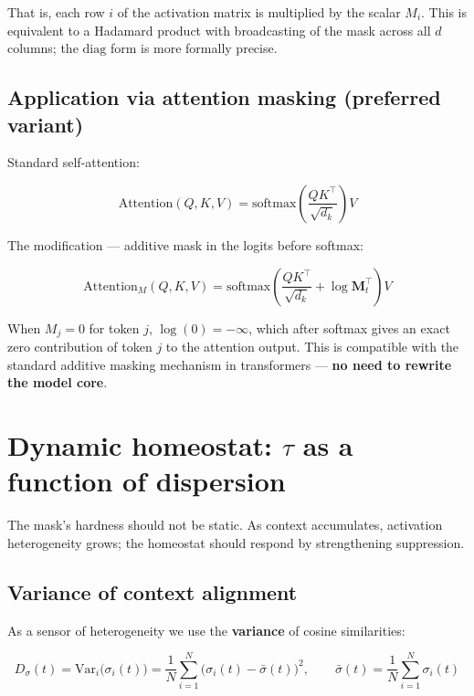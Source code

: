 \documentclass[12pt,a4paper]{article}
\begin{document}
That is, each row $i$ of the activation matrix is multiplied by the scalar $M_i$. This is equivalent to a Hadamard product with broadcasting of the mask across all $d$ columns; the $\mathrm{diag}$ form is more formally precise.

\subsection{Application via attention masking (preferred variant)}

Standard self-attention:

\begin{equation}
\mathrm{Attention}(Q, K, V) = \mathrm{softmax}\!\left(\frac{Q K^\top}{\sqrt{d_k}}\right) V
\end{equation}

The modification --- additive mask in the logits before softmax:

\begin{equation}
\boxed{
\mathrm{Attention}_M(Q, K, V) = \mathrm{softmax}\!\left(\frac{Q K^\top}{\sqrt{d_k}} + \log \mathbf{M}_t^\top\right) V
}
\end{equation}

When $M_j = 0$ for token $j$, $\log(0) = -\infty$, which after softmax gives an exact zero contribution of token $j$ to the attention output. This is compatible with the standard additive masking mechanism in transformers --- \textbf{no need to rewrite the model core}.

\section{Dynamic homeostat: $\tau$ as a function of dispersion}

The mask's hardness should not be static. As context accumulates, activation heterogeneity grows; the homeostat should respond by strengthening suppression.

\subsection{Variance of context alignment}

As a sensor of heterogeneity we use the \textbf{variance} of cosine similarities:

\begin{equation}
D_\sigma(t) = \mathrm{Var}_i\bigl(\sigma_i(t)\bigr) = \frac{1}{N}\sum_{i=1}^{N}\bigl(\sigma_i(t) - \bar{\sigma}(t)\bigr)^2, \qquad \bar{\sigma}(t) = \frac{1}{N}\sum_{i=1}^{N}\sigma_i(t)
\end{equation}
\end{document}
